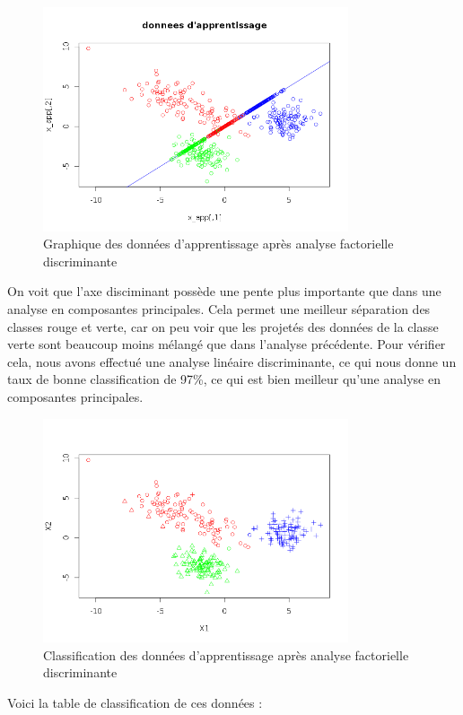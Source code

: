\documentclass[a4paper,11pt]{article}
\begin{document}
  \begin{figure}[H]
  \center
   \includegraphics[width=9cm]{app_fact.png}
   \caption{Graphique des données d'apprentissage après analyse factorielle discriminante}
  \end{figure}
  
  On voit que l'axe disciminant possède une pente plus importante que dans une analyse en 
  composantes principales. Cela permet une meilleur séparation des classes rouge et verte, car
  on peu voir que les projetés des données de la classe verte sont beaucoup moins mélangé 
  que dans l'analyse précédente. Pour vérifier cela, nous avons effectué une analyse linéaire
  discriminante, ce qui nous donne un taux de bonne classification de 97\%, ce qui est bien
  meilleur qu'une analyse en composantes principales. 
  
  \begin{figure}[H]
    \center
   \includegraphics[width=9cm]{app_fact_class.png}
    \caption{Classification des données d'apprentissage après analyse factorielle discriminante}
  \end{figure}

  Voici la table de classification de ces 
  données : \\
  
\end{document}
